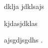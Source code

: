 \documentclass[10pt]{article}
\begin{document}
\begin{multicols*}{2}
\begin{table}[H]
\begin{tabular}{|c|c|c|c|}
	\end{tabular}

\end{table}



dklja
jdklsajs


kjdasjdklas

	ajsgdjsgdhs \cite{x6MD_man}.


\printbibliography

	\AtEndDocument{}
\end{multicols*}
\end{document}
